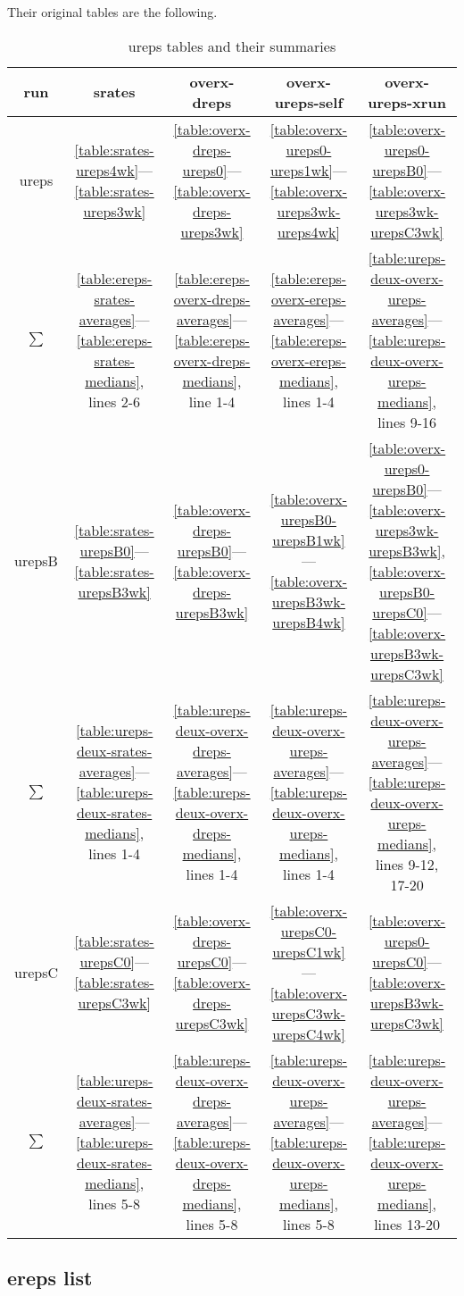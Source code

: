 \documentclass[10pt,oneside]{memoir}
\begin{document}
Their original tables are the following.



\begin{table}
\begin{tabular}{|ccccc|}
\toprule
run & srates & overx-dreps & overx-ureps-self & overx-ureps-xrun \\
\midrule
ureps & \ref{table:srates-ureps4wk}—\ref{table:srates-ureps3wk} & \ref{table:overx-dreps-ureps0}—\ref{table:overx-dreps-ureps3wk} & \ref{table:overx-ureps0-ureps1wk}—\ref{table:overx-ureps3wk-ureps4wk} & \ref{table:overx-ureps0-urepsB0}—\ref{table:overx-ureps3wk-urepsC3wk} \\
$\sum$ & \ref{table:ereps-srates-averages}—\ref{table:ereps-srates-medians}, lines 2-6 & \ref{table:ereps-overx-dreps-averages}—\ref{table:ereps-overx-dreps-medians}, line 1-4 & \ref{table:ereps-overx-ereps-averages}—\ref{table:ereps-overx-ereps-medians}, lines 1-4 & \ref{table:ureps-deux-overx-ureps-averages}—\ref{table:ureps-deux-overx-ureps-medians}, lines 9-16 \\
\hline
urepsB & \ref{table:srates-urepsB0}—\ref{table:srates-urepsB3wk} & \ref{table:overx-dreps-urepsB0}—\ref{table:overx-dreps-urepsB3wk} & \ref{table:overx-urepsB0-urepsB1wk}—\ref{table:overx-urepsB3wk-urepsB4wk} & \ref{table:overx-ureps0-urepsB0}—\ref{table:overx-ureps3wk-urepsB3wk}, \ref{table:overx-urepsB0-urepsC0}—\ref{table:overx-urepsB3wk-urepsC3wk} \\
$\sum$ & \ref{table:ureps-deux-srates-averages}—\ref{table:ureps-deux-srates-medians}, lines 1-4 & \ref{table:ureps-deux-overx-dreps-averages}—\ref{table:ureps-deux-overx-dreps-medians}, lines 1-4 & \ref{table:ureps-deux-overx-ureps-averages}—\ref{table:ureps-deux-overx-ureps-medians}, lines 1-4 & \ref{table:ureps-deux-overx-ureps-averages}—\ref{table:ureps-deux-overx-ureps-medians}, lines 9-12, 17-20 \\
\hline
urepsC & \ref{table:srates-urepsC0}—\ref{table:srates-urepsC3wk} & \ref{table:overx-dreps-urepsC0}—\ref{table:overx-dreps-urepsC3wk} & \ref{table:overx-urepsC0-urepsC1wk}—\ref{table:overx-urepsC3wk-urepsC4wk} & \ref{table:overx-ureps0-urepsC0}—\ref{table:overx-urepsB3wk-urepsC3wk} \\
$\sum$ & \ref{table:ureps-deux-srates-averages}—\ref{table:ureps-deux-srates-medians}, lines 5-8 & \ref{table:ureps-deux-overx-dreps-averages}—\ref{table:ureps-deux-overx-dreps-medians}, lines 5-8 & \ref{table:ureps-deux-overx-ureps-averages}—\ref{table:ureps-deux-overx-ureps-medians}, lines 5-8 & \ref{table:ureps-deux-overx-ureps-averages}—\ref{table:ureps-deux-overx-ureps-medians}, lines 13-20 \\
\bottomrule
\end{tabular}
\caption{ureps tables and their summaries}
\label{table:ureps-tables}
\end{table}
\pagebreak \subsection{ereps list}
\label{erepslist}
\end{document}
